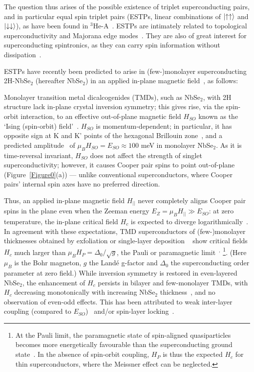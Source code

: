 \documentclass[showpacs,superscriptaddress,preprint,prb]{revtex4}
\begin{document}
The question thus arises of the possible existence of triplet superconducting pairs, and in particular equal spin triplet pairs (ESTPs, linear combinations of $\ket{\uparrow \uparrow}$ and $\ket{\downarrow \downarrow}$), as have been found in $^3$He-A~\cite{leggett}. ESTPs are intimately related to topological superconductivity and Majorana edge modes~\cite{frolov}. They are also of great interest for superconducting spintronics, as they can carry spin information without dissipation~\cite{ohnishi}.

ESTPs have recently been predicted to arise in (few-)monolayer superconducting 2H-NbSe$_2$ (hereafter NbSe$_2$) in an applied in-plane magnetic field~\cite{mockli2020}, as follows: 

Monolayer transition metal dicalcogenides (TMDs), such as NbSe$_2$, with 2H structure lack in-plane crystal inversion symmetry; this gives rise, via the spin-orbit interaction, to an effective out-of-plane magnetic field $H_{SO}$ known as the `Ising (spin-orbit) field'~\cite{frigeri2004,gorkov2001,saito2016,lu2015}. $H_{SO}$ is momentum-dependent; in particular, it has opposite sign at K and K' points of the hexagonal Brillouin zone~\cite{xu2014}, and a predicted amplitude~\cite{wickramaratne2020} of $\mu_B H_{SO} = E_{SO} \approx 100$ meV in monolayer NbSe$_2$. As it is time-reversal invariant, $H_{SO}$ does not affect the strength of singlet superconductivity; however, it causes Cooper pair spins to point out-of-plane (Figure~\ref{Figure0}(a)) --- unlike conventional superconductors, where Cooper pairs' internal spin axes have no preferred direction.

Thus, an applied in-plane magnetic field $H_{||}$ never completely aligns Cooper pair spins in the plane even when the Zeeman energy $E_Z = \mu_{B}H_{||} \gg E_{SO}$: at zero temperature, the in-plane critical field $H_c$ is expected to diverge logarithmically~\cite{frigeri2004,ilic2017}. In agreement with these expectations, TMD superconductors of (few-)monolayer thicknesses obtained by exfoliation \cite{wang2012} or single-layer deposition ~\cite{zhang2010,fan2015} show critical fields $H_c$ much larger than $\mu_B H_P = \Delta_0/ \sqrt{g}$, the Pauli or paramagnetic limit~\cite{xi2016,liu2018}$^,$ \footnote{At the Pauli limit, the paramagnetic state of spin-aligned quasiparticles becomes more energetically favourable than the superconducting ground state~\cite{clogston1962, fulde1973}. In the absence of spin-orbit coupling, $H_P$ is thus the expected $H_c$ for thin superconductors, where the Meissner effect can be neglected.}. (Here $\mu_B$ is the Bohr magneton, $g$ the Landé g-factor and $\Delta_0$ the superconducting order parameter at zero field.) While inversion symmetry is restored in even-layered NbSe$_2$, the enhancement of $H_c$ persists in bilayer and few-monolayer TMDs, with $H_c$ decreasing monotonically with increasing NbSe$_2$ thickness~\cite{xi2016,barrera2018,prober1980}, and no observation of even-odd effects. This has been attributed to weak inter-layer coupling (compared to $E_{SO}$)~\cite{jones2014} and/or spin-layer locking~\cite{xi2016}.
\end{document}
